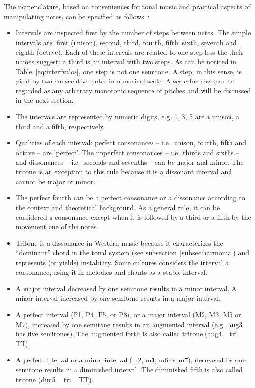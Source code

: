 The nomenclature, based on conveniences for tonal music and practical aspects of manipulating notes, can be specified
as follows~\cite{Roederer,Wisnick}:

\begin{itemize}
	\item Intervals are inspected first by the number of steps between notes. The simple intervals are: first (unison), second, third, fourth, fifth, sixth, seventh and eighth (octave).
		Each of these intervals are related to one step less the their names suggest: a third is an interval with two steps.
		As can be noticed in Table~\ref{eq:interfvalos}, one step is not one semitone.
		A step, in this sense, is yield by two consecutive notes in a musical scale.
		A scale for now can be regarded as any arbitrary monotonic sequence of pitches and will be discussed in the next section.
	\item The intervals are represented by numeric digits, e.g. 1, 3, 5 are a unison, a third and a fifth, respectively.
	\item Qualities of each interval: perfect consonances --
                i.e.\ unison, fourth, fifth and octave -- are 'perfect'. The imperfect consonances -- i.e.\ thirds and sixths -- and dissonances -- i.e.\ seconds and sevenths -- can be major and minor. The tritone is an exception to this rule because it is a dissonant interval and cannot be major or minor.
	\item The perfect fourth can be a perfect consonance or a dissonance according to the context and theoretical background. As a general rule, it can be considered a consonance except when it is followed by a third or a fifth by the movement one of the notes.
	\item Tritone is a dissonance in Western music because
		it characterizes the ``dominant'' chord in the tonal system (see subsection~\ref{subsec:harmonia}) and represents (or yields) instability. Some cultures considers the interval a consonance, using it in melodies and chants as a stable interval.
	\item A major interval decreased by one semitone results in a minor interval. A minor interval increased by one semitone results in a major interval.
	\item A perfect interval (P1, P4, P5, or P8), or a major interval (M2, M3, M6 or M7), increased
by one semitone results in an augmented interval (e.g.\
aug3 has five semitones). The augmented forth
is also called tritone (aug4 ~ tri ~ TT).
	\item A perfect interval or a minor interval (m2, m3, m6 or m7), decreased by one semitone results in a diminished interval. The
diminished fifth is also called tritone (dim5 ~ tri ~ TT).


\end{itemize}
